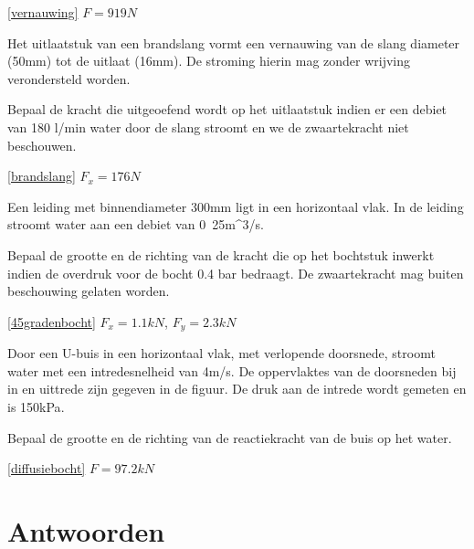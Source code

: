 	\begin{antwoord}{\ref{vernauwing}}
		$F = \unit{919}{N}$
	\end{antwoord}
	\begin{toepassing}[*]
		\label{brandslang}
Het uitlaatstuk van een brandslang vormt een vernauwing van de slang diameter (50mm) tot de uitlaat (16mm). De stroming hierin mag zonder wrijving verondersteld worden.

Bepaal de kracht die uitgeoefend wordt op het uitlaatstuk indien er een debiet van 180 l/min water door de slang stroomt en we de zwaartekracht niet beschouwen.
		\begin{center}
		\end{center}
	\end{toepassing}
	\begin{antwoord}{\ref{brandslang}}
		$F_x = \unit{176}{N}$
	\end{antwoord}
	\begin{toepassing}[*]
		\label{45gradenbocht}
Een leiding met binnendiameter 300mm ligt in een horizontaal vlak. In de leiding stroomt water aan een debiet van \unit{0.25}{m^3/s}.    

Bepaal de grootte en de richting van de kracht die op het bochtstuk inwerkt indien de overdruk voor de bocht 0.4 bar bedraagt. De zwaartekracht mag buiten beschouwing gelaten worden.
		\begin{center}
			
		\end{center}
	\end{toepassing}
	\begin{antwoord}{\ref{45gradenbocht}}
		$F_x = \unit{1.1}{kN}$, $F_y = \unit{2.3}{kN}$
	\end{antwoord}
	\begin{toepassing}[*]
		\label{diffusiebocht}
Door een U-buis in een horizontaal vlak, met verlopende doorsnede, stroomt water met een intredesnelheid van \unit{4}{m/s}. De oppervlaktes van de doorsneden bij in en uittrede zijn gegeven in de figuur. De druk aan de intrede wordt gemeten en is \unit{150}{kPa}.
		
Bepaal de grootte en de richting van de reactiekracht van de buis op het water.
		\begin{center}
			
		\end{center}
	\end{toepassing}
	\begin{antwoord}{\ref{diffusiebocht}}
		$F = \unit{97.2}{kN}$
	\end{antwoord}
	
	\section*{Antwoorden}
	\begin{multicols}{2}
	\end{multicols}